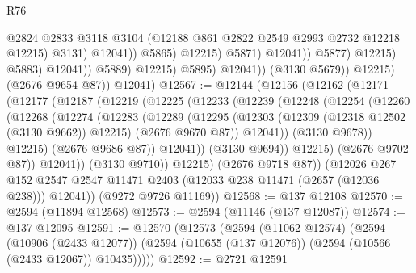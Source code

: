 \begin{lexlean}{R76}
\begin{coremodule}
                                                @2824
                                                @2833
                                                @3118
                                                @3104
                                                (@12188 @861 @2822 @2549 @2993 @2732 @12218 @12215)
                                                @3131)
                                              @12041))
                                          @5865)
                                        @12215)
                                      @5871)
                                    @12041))
                                @5877)
                              @12215)
                            @5883)
                          @12041))
                      @5889)
                    @12215)
                  @5895)
                @12041))
            (@3130 @5679))
          @12215)
        (@2676 @9654 @87))
      @12041)
@12567 := @12144
    (@12156
      (@12162
        (@12171
          (@12177
            (@12187
              (@12219
                (@12225
                  (@12233
                    (@12239
                      (@12248
                        (@12254
                          (@12260
                            (@12268
                              (@12274
                                (@12283
                                  (@12289
                                    (@12295
                                      (@12303
                                        (@12309 (@12318 @12502 (@3130 @9662)) @12215)
                                        (@2676 @9670 @87))
                                      @12041))
                                  (@3130 @9678))
                                @12215)
                              (@2676 @9686 @87))
                            @12041))
                        (@3130 @9694))
                      @12215)
                    (@2676 @9702 @87))
                  @12041))
              (@3130 @9710))
            @12215)
          (@2676 @9718 @87))
        (@12026
          @267
          @152
          @2547
          @2547
          @11471
          @2403
          (@12033 @238 @11471 (@2657 (@12036 @238)))
          @12041))
      (@9272 @9726 @11169))
@12568 := @137 @12108
@12570 := @2594 (@11894 @12568)
@12573 := @2594 (@11146 (@137 @12087))
@12574 := @137 @12095
@12591 := @12570
    (@12573
      (@2594
        (@11062 @12574)
        (@2594
          (@10906 (@2433 @12077))
          (@2594 (@10655 (@137 @12076)) (@2594 (@10566 (@2433 @12067)) @10435)))))
@12592 := @2721 @12591

\end{coremodule}
\end{lexlean}
